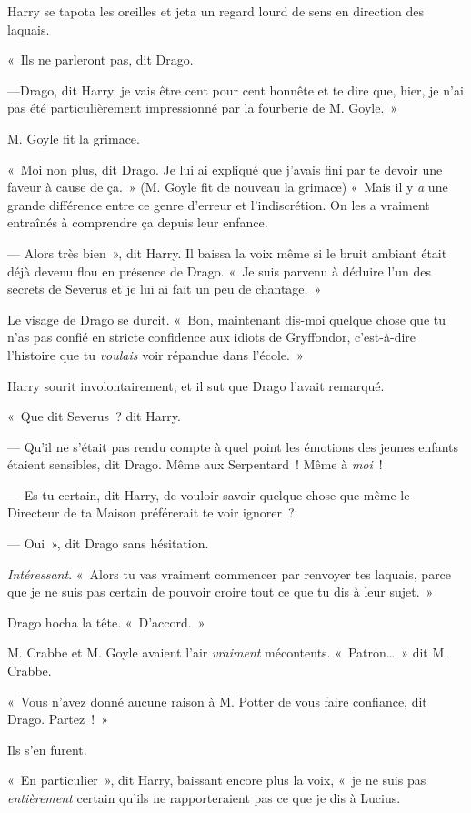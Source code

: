 Harry se tapota les oreilles et jeta un regard lourd de sens en direction des laquais.

«~Ils ne parleront pas, dit Drago.

---Drago, dit Harry, je vais être cent pour cent honnête et te dire que, hier, je n'ai pas été particulièrement impressionné par la fourberie de M. Goyle.~»

M. Goyle fit la grimace.

«~Moi non plus, dit Drago. Je lui ai expliqué que j'avais fini par te devoir une faveur à cause de ça.~» (M. Goyle fit de nouveau la grimace) «~Mais il y \emph{a} une grande différence entre ce genre d'erreur et l'indiscrétion. On les a vraiment entraînés à comprendre ça depuis leur enfance.

--- Alors très bien~», dit Harry. Il baissa la voix même si le bruit ambiant était déjà devenu flou en présence de Drago. «~Je suis parvenu à déduire l'un des secrets de Severus et je lui ai fait un peu de chantage.~»

Le visage de Drago se durcit. «~Bon, maintenant dis-moi quelque chose que tu n'as pas confié en stricte confidence aux idiots de Gryffondor, c'est-à-dire l'histoire que tu \emph{voulais} voir répandue dans l'école.~»

Harry sourit involontairement, et il sut que Drago l'avait remarqué.

«~Que dit Severus~? dit Harry.

--- Qu'il ne s'était pas rendu compte à quel point les émotions des jeunes enfants étaient sensibles, dit Drago. Même aux Serpentard~! Même à \emph{moi}~!

--- Es-tu certain, dit Harry, de vouloir savoir quelque chose que même le Directeur de ta Maison préférerait te voir ignorer~?

--- Oui~», dit Drago sans hésitation.

\emph{Intéressant}. «~Alors tu vas vraiment commencer par renvoyer tes laquais, parce que je ne suis pas certain de pouvoir croire tout ce que tu dis à leur sujet.~»

Drago hocha la tête. «~D'accord.~»

M. Crabbe et M. Goyle avaient l'air \emph{vraiment} mécontents. «~Patron…~» dit M. Crabbe.

«~Vous n'avez donné aucune raison à M. Potter de vous faire confiance, dit Drago. Partez~!~»

Ils s'en furent.

«~En particulier~», dit Harry, baissant encore plus la voix, «~je ne suis pas \emph{entièrement} certain qu'ils ne rapporteraient pas ce que je dis à Lucius.

